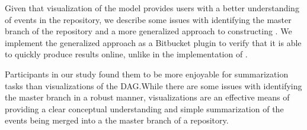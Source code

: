 Given that visualization of the model provides users with a better
understanding of events in the repository, we describe some issues with
identifying the master branch of the repository and a more generalized
approach to constructing . We implement  the generalized approach
as a Bitbucket plugin to verify that it is able to quickly produce
results online, unlike in the implementation of \tool.

Participants in our study found them  to be more enjoyable for
summarization tasks than visualizations of the DAG.\@ While there are
some issues  with identifying the master branch in a robust manner, \mt
visualizations are an effective means of providing a clear conceptual
understanding and simple summarization of the events being merged into a
the master branch of a repository.


